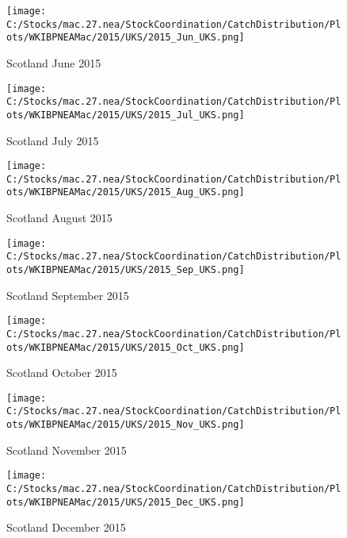 \documentclass{article}
\begin{document}
\begin{figure}
	\centering
		\texttt{[image: C:/Stocks/mac.27.nea/StockCoordination/CatchDistribution/Plots/WKIBPNEAMac/2015/UKS/2015\_Jun\_UKS.png]}
	\caption{Scotland June 2015}
	\label{fig:2015_Jun_UKS}
\end{figure}

\begin{figure}
	\centering
		\texttt{[image: C:/Stocks/mac.27.nea/StockCoordination/CatchDistribution/Plots/WKIBPNEAMac/2015/UKS/2015\_Jul\_UKS.png]}
	\caption{Scotland July 2015}
	\label{fig:2015_Jul_UKS}
\end{figure}

\begin{figure}
	\centering
		\texttt{[image: C:/Stocks/mac.27.nea/StockCoordination/CatchDistribution/Plots/WKIBPNEAMac/2015/UKS/2015\_Aug\_UKS.png]}
	\caption{Scotland August 2015}
	\label{fig:2015_Aug_UKS}
\end{figure}

\begin{figure}
	\centering
		\texttt{[image: C:/Stocks/mac.27.nea/StockCoordination/CatchDistribution/Plots/WKIBPNEAMac/2015/UKS/2015\_Sep\_UKS.png]}
	\caption{Scotland September 2015}
	\label{fig:2015_Sep_UKS}
\end{figure}

\begin{figure}
	\centering
		\texttt{[image: C:/Stocks/mac.27.nea/StockCoordination/CatchDistribution/Plots/WKIBPNEAMac/2015/UKS/2015\_Oct\_UKS.png]}
	\caption{Scotland October 2015}
	\label{fig:2015_Oct_UKS}
\end{figure}

\begin{figure}
	\centering
		\texttt{[image: C:/Stocks/mac.27.nea/StockCoordination/CatchDistribution/Plots/WKIBPNEAMac/2015/UKS/2015\_Nov\_UKS.png]}
	\caption{Scotland November 2015}
	\label{fig:2015_Nov_UKS}
\end{figure}

\begin{figure}
	\centering
		\texttt{[image: C:/Stocks/mac.27.nea/StockCoordination/CatchDistribution/Plots/WKIBPNEAMac/2015/UKS/2015\_Dec\_UKS.png]}
	\caption{Scotland December 2015}
	\label{fig:2015_Dec_UKS}
\end{figure}

\clearpage

\newpage
\end{document}
